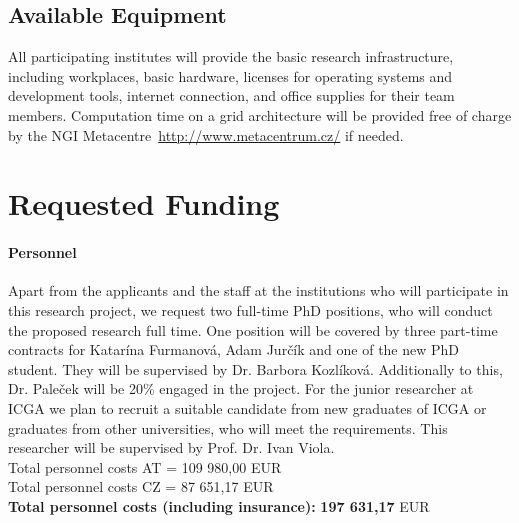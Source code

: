 \documentclass[11pt,a4paper,titlepage,oneside,onecolumn]{article}
\begin{document}
\subsection{Available Equipment}
\vspace{-4mm}
\label{subsec:AvailableEquipment}
All participating institutes will provide the basic research infrastructure, including workplaces, basic hardware, licenses for operating systems and development tools, internet connection, and office supplies for their team members. 
Computation time on a grid architecture will be provided free of charge by the NGI Metacentre~\url{http://www.metacentrum.cz/} if needed. 


\section{Requested Funding}
\vspace{-5mm}
\label{sec:RequestedFunding}

\paragraph{Personnel}
Apart from the applicants and the staff at the institutions who will participate in this research project, we request two full-time PhD positions, who will conduct the proposed research full time. 
One position will be covered by three part-time contracts for Katar\'{i}na Furmanov\'{a}, Adam Jur\v{c}\'{i}k and one of the new PhD student. 
They will be supervised by Dr. Barbora Kozl\'{i}kov\'{a}.
Additionally to this, Dr. Pale\v{c}ek will be 20\% engaged in the project.
For the junior researcher at ICGA we plan to recruit a suitable candidate from new graduates of ICGA or graduates from other universities, who will meet the requirements.
This researcher will be supervised by Prof. Dr. Ivan Viola.\\
Total personnel costs AT = 109 980,00 EUR\\
Total personnel costs CZ = 87 651,17 EUR\\
\textbf{Total personnel costs (including insurance):}   \textbf{197 631,17} EUR
\end{document}
